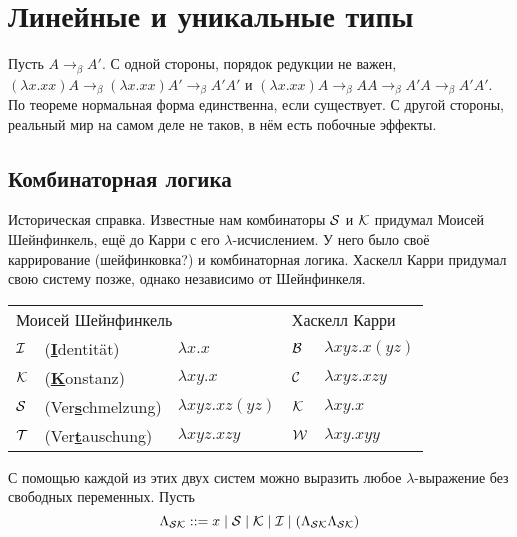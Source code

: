 \section{\texorpdfstring{Линейные и уникальные типы}{Linear and unique types}}

Пусть $A \to_\beta A'$.
С одной стороны, порядок редукции не важен, %
$(\lambda x . x x) A \to_\beta (\lambda x . x x) A' \to_\beta A' A'$
и $(\lambda x . x x) A \to_\beta A A \to_\beta A' A \to_\beta A' A'$.
По теореме  нормальная форма единственна, если существует.
С другой стороны, реальный мир на самом деле не таков, в нём есть побочные эффекты.

\subsection{\texorpdfstring{Комбинаторная логика}{Combinatory logic}}

Историческая справка. Известные нам комбинаторы $\operatorname{\mathcal{S}}$ и $\operatorname{\mathcal{K}}$ придумал Моисей Шейнфинкель,
ещё до Карри с его $\lambda$-исчислением.
У него было своё каррирование (шейфинковка?) и комбинаторная логика.
Хаскелл Карри придумал свою систему позже, однако независимо от Шейнфинкеля.

\begin{center} \newcommand{\eemph}[1]{\underline{\textbf{#1}}}
\begin{tabular}{l l l l l} \toprule
    \multicolumn{3}{l}{Моисей Шейнфинкель} & \multicolumn{2}{l}{Хаскелл Карри} \\ \cmidrule(lr){1-3} \cmidrule(lr){4-5}
    $\operatorname{\mathcal{I}}$ & (\eemph{I}dentität)     & $\lambda x . x$             & $\operatorname{\mathcal{B}}$ & $\lambda x y z . x (y z)$ \\
    $\operatorname{\mathcal{K}}$ & (\eemph{K}onstanz)      & $\lambda x y . x$           & $\operatorname{\mathcal{C}}$ & $\lambda x y z . x z y$   \\
    $\operatorname{\mathcal{S}}$ & (Ver\eemph{s}chmelzung) & $\lambda x y z . x z (y z)$ & $\operatorname{\mathcal{K}}$ & $\lambda x y . x$         \\
    $\operatorname{\mathcal{T}}$ & (Ver\eemph{t}auschung)  & $\lambda x y z . x z y$     & $\operatorname{\mathcal{W}}$ & $\lambda x y . x y y$ \\ \bottomrule
\end{tabular} %
\end{center}

С помощью каждой из этих двух систем можно выразить любое $\lambda$-выражение без свободных переменных.
Пусть
\[
    \Lambda_{\operatorname{\mathcal{SK}}} ::= x \mid \operatorname{\mathcal{S}} \mid \operatorname{\mathcal{K}} \mid \operatorname{\mathcal{I}} \mid (\Lambda_{\operatorname{\mathcal{SK}}} \Lambda_{\operatorname{\mathcal{SK}}})
\]

